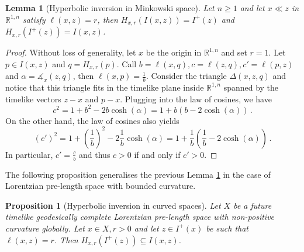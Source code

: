 \documentclass[hidelinks,12pt,a4paper]{article}
\numberwithin{equation}{section}
\theoremstyle{plain}
\newtheorem{proposition}[definition]{Proposition}
\newtheorem{lemma}[definition]{Lemma}
\theoremstyle{definition}
\newcommand{\LpLS}{Lo\-rentz\-ian pre-length space }
\begin{document}
\begin{lemma}[Hyperbolic inversion in Minkowski space]
\label{lem: hyperbolic inversion minkowski space}
Let $n \geq 1$ and let $x \ll z$ in $\mathbb R^{1,n}$ satisfy $\ell(x,z) = r$, then $H_{x,r}(I(x,z))=I^+(z)$ and $H_{x,r}(I^+(z))=I(x,z)$.
\end{lemma}

\begin{proof}
Without loss of generality, let $x$ be the origin in $\mathbb R^{1,n}$ and set $r=1$. Let $p \in I(x,z)$ and $q=H_{x,r}(p)$. 
Call $b=\ell(x,q), c= \ell(z,q), c'=\ell(p,z)$ and $\alpha=\measuredangle_x(z,q)$, then $\ell(x,p)=\frac1b$. Consider the triangle $\Delta(x,z,q)$ and notice that this triangle fits in the timelike plane inside $\mathbb R^{1,n}$ spanned by the timelike vectors $z-x$ and $p-x$. Plugging into the law of cosines, we have
\begin{equation*}
c^2 = 1 + b^2 - 2b\cosh(\alpha) = 1 + b(b-2\cosh(\alpha)) \, .
\end{equation*}
On the other hand, the law of cosines also yields 
\begin{equation*}
(c')^2 = 1 + \left(\frac1b\right)^2 - 2\frac1b\cosh(\alpha) = 1 + \frac1b \left( \frac1b-2\cosh(\alpha) \right) \, .
\end{equation*}
In particular, $c'= \frac{c}{b}$ and thus $c>0$ if and only if $c'>0$. 
\end{proof} 

The following proposition generalises the previous Lemma \ref{lem: hyperbolic inversion minkowski space} in the case of \LpLS with bounded curvature. 

\begin{proposition}[Hyperbolic inversion in curved spaces] 
Let $X$ be a future timelike geodesically complete \LpLS with non-positive curvature globally. 
Let $x \in X, r >0$ and let $z \in I^+(x)$ be such that $\ell(x,z)=r$. 
Then $H_{x,r}(I^+(z)) \subseteq I(x,z)$. 
\end{proposition}
\end{document}
